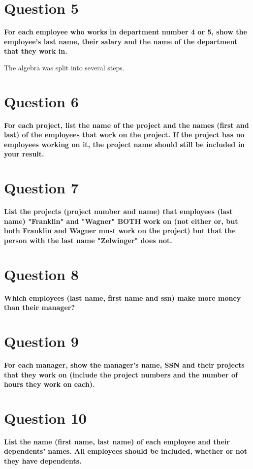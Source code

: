 \documentclass{article}
\begin{document}
\section{Question 5}

    \textbf{For each employee who works in department number 4 or 5, show the employee's last name, their salary and the name of the department that they work in.}

    The algebra was split into several steps.



\section{Question 6}

    \textbf{For each project, list the name of the project and the names (first and last) of the employees that work on the project.  If the project has no employees working on it, the project name should still be included in your result.}

\section{Question 7}

    \textbf{List the projects (project number and name) that employees (last name)  "Franklin" and "Wagner" BOTH work on (not either or, but both Franklin and Wagner must work on the project) but that the person with the last name "Zelwinger" does not.}

\section{Question 8}

    \textbf{Which employees (last name, first name and ssn) make more money than their manager?}

\section{Question 9}

    \textbf{For each manager, show the manager's name, SSN and their projects that they work on (include the project numbers and the number of hours they work on each).}

\section{Question 10}

    \textbf{List the name (first name, last name) of each employee and their dependents' names.  All employees should be included, whether or not they have dependents.}
    
\end{document}
